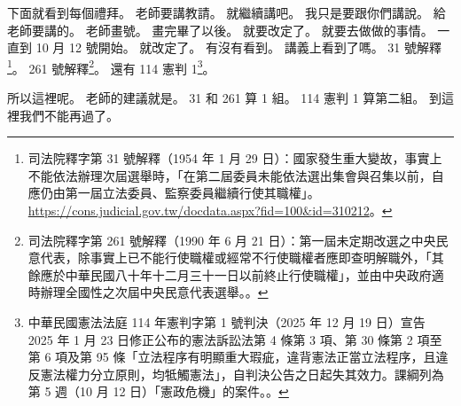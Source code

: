 \hypertarget{c01:cue:1468}{}下面就看到每個禮拜。
\hypertarget{c01:cue:1469}{}老師要講教請。
\hypertarget{c01:cue:1470}{}就繼續講吧。
\hypertarget{c01:cue:1471}{}我只是要跟你們講說。
\hypertarget{c01:cue:1472}{}給老師要講的。
\hypertarget{c01:cue:1473}{}老師畫號。
\hypertarget{c01:cue:1474}{}畫完畢了以後。
\hypertarget{c01:cue:1475}{}就要改定了。
\hypertarget{c01:cue:1476}{}就要去做做的事情。
\hypertarget{c01:cue:1477}{}一直到 10 月 12 號開始。
\hypertarget{c01:cue:1478}{}就改定了。
\hypertarget{c01:cue:1479}{}有沒有看到。
\hypertarget{c01:cue:1480}{}講義上看到了嗎。
\hypertarget{c01:cue:1481}{}31 號解釋\footnote{司法院釋字第 31 號解釋（1954 年 1 月 29 日）：國家發生重大變故，事實上不能依法辦理次屆選舉時，「在第二屆委員未能依法選出集會與召集以前，自應仍由第一屆立法委員、監察委員繼續行使其職權」。\url{https://cons.judicial.gov.tw/docdata.aspx?fid=100&id=310212}。}。
\hypertarget{c01:cue:1482}{}261 號解釋\footnote{司法院釋字第 261 號解釋（1990 年 6 月 21 日）：第一屆未定期改選之中央民意代表，除事實上已不能行使職權或經常不行使職權者應即查明解職外，「其餘應於中華民國八十年十二月三十一日以前終止行使職權」，並由中央政府適時辦理全國性之次屆中央民意代表選舉。\cite{jy261}。}。
\hypertarget{c01:cue:1483}{}還有 114 憲判 1\footnote{中華民國憲法法庭 114 年憲判字第 1 號判決（2025 年 12 月 19 日）宣告 2025 年 1 月 23 日修正公布的憲法訴訟法第 4 條第 3 項、第 30 條第 2 項至第 6 項及第 95 條「立法程序有明顯重大瑕疵，違背憲法正當立法程序，且違反憲法權力分立原則，均牴觸憲法」，自判決公告之日起失其效力。課綱列為第 5 週（10 月 12 日）「憲政危機」的案件。\cite{ccj114-1}。}。

\hypertarget{c01:cue:1484}{}所以這裡呢。
\hypertarget{c01:cue:1485}{}老師的建議就是。
\hypertarget{c01:cue:1486}{}31 和 261 算 1 組。
\hypertarget{c01:cue:1487}{}114 憲判 1 算第二組。
\hypertarget{c01:cue:1488}{}到這裡我們不能再過了。


